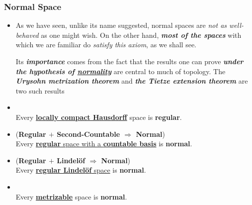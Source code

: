 \documentclass[11pt]{article}
\begin{document}
\subsubsection{Normal Space}
\begin{itemize}
\item \begin{remark}
As we have seen, unlike its name suggested, normal spaces are \emph{not as well-behaved} as one might wish.  On the other hand, \emph{\textbf{most of the spaces}} with which we are familiar do \emph{satisfy this axiom}, as we shall see. 

Its \emph{\textbf{importance}} comes from the fact that the results one can prove \emph{\textbf{under the hypothesis of \underline{normality}}} are central to much of topology. The \emph{\textbf{Urysohn metrization theorem}} and \emph{\textbf{the Tietze extension theorem}} are two such results
\end{remark}

\item \begin{proposition}  \citep{munkres2000topology} \\
Every \underline{\textbf{locally compact Hausdorff}} space is \textbf{regular}.
\end{proposition}



\item \begin{theorem} (\textbf{Regular $+$ Second-Countable $\Rightarrow$ Normal})\citep{munkres2000topology}\\
Every \underline{\textbf{regular} space with a \textbf{countable basis}} is \textbf{normal}.
\end{theorem}

\item \begin{proposition}   (\textbf{Regular $+$ Lindel{\"o}f $\Rightarrow$ Normal})\citep{munkres2000topology}\\
Every \underline{\textbf{regular Lindel{\"o}f} space} is \textbf{normal}.
\end{proposition}



\item \begin{theorem} \citep{munkres2000topology}\\
Every \underline{\textbf{metrizable}} space is \textbf{normal}.
\end{theorem}



\end{itemize}
\end{document}
